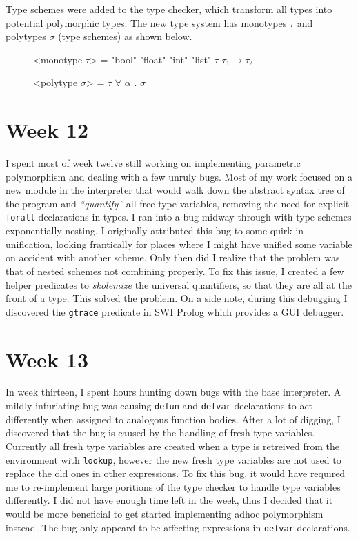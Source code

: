 \documentclass[11pt,a4paper]{article}
\begin{document}
Type schemes were added to the type checker, which transform all types
into potential polymorphic types. The new type system has monotypes $\tau$
and polytypes $\sigma$ (type schemes) as shown below.

\begin{figure}[H]
\small
\setlength{\grammarindent}{8em}
\begin{grammar}
<monotype $\tau$> = "bool"
    \alt "float"
    \alt "int"
    \alt "list" $\tau$
    \alt $\tau_1 \rightarrow \tau_2$

<polytype $\sigma$> = $\tau$
    \alt $\forall$ $\alpha$ . $\sigma$
\end{grammar}
\end{figure}


\section*{Week 12}

I spent most of week twelve still working on implementing parametric polymorphism
and dealing with a few unruly bugs. Most of my work focused on a new module in
the interpreter that would walk down the abstract syntax tree of the program
and \textit{``quantify''} all free type variables, removing the need for explicit
\verb|forall| declarations in types. I ran into a bug midway through with type
schemes exponentially nesting. I originally attributed this bug to some quirk in
unification, looking frantically for places where I might have unified some
variable on accident with another scheme. Only then did I realize that the problem
was that of nested schemes not combining properly. To fix this issue, I created a
few helper predicates to \textit{skolemize} the universal quantifiers, so that they
are all at the front of a type. This solved the problem. On a side note, during
this debugging I discovered the \verb|gtrace| predicate in SWI Prolog which
provides a GUI debugger.


\section*{Week 13}

In week thirteen, I spent hours hunting down bugs with the base interpreter. A
mildly infuriating bug was causing \verb|defun| and \verb|defvar| declarations
to act differently when assigned to analogous function bodies. After a lot of
digging, I discovered that the bug is caused by the handling of fresh type
variables. Currently all fresh type variables are created when a type is
retreived from the environment with \verb|lookup|, however the new fresh
type variables are not used to replace the old ones in other expressions. To
fix this bug, it would have required me to re-implement large poritions of the
type checker to handle type variables differently. I did not have enough time
left in the week, thus I decided that it would be more beneficial to get started
implementing adhoc polymorphism instead. The bug only appeard to be affecting
expressions in \verb|defvar| declarations.
\end{document}
